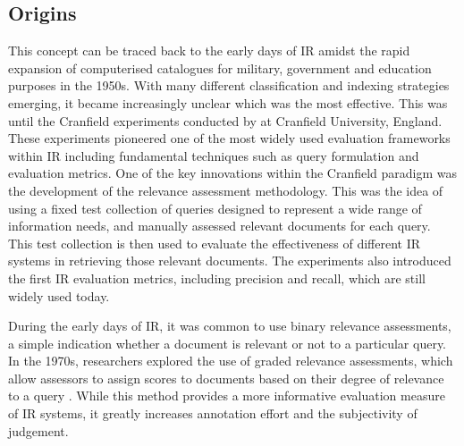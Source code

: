 \documentclass{l4proj}
\begin{document}
\subsection{Origins}
This concept can be traced back to the early days of IR amidst the rapid expansion of computerised catalogues for military, government and education purposes in the 1950s. With many different classification and indexing strategies emerging, it became increasingly unclear which was the most effective. This was until the Cranfield experiments conducted by \cite{cleverdon1967cranfield} at Cranfield University, England. These experiments pioneered one of the most widely used evaluation frameworks within IR including fundamental techniques such as query formulation and evaluation metrics. One of the key innovations within the Cranfield paradigm was the development of the relevance assessment methodology. This was the idea of using a fixed test collection of queries designed to represent a wide range of information needs, and manually assessed relevant documents for each query. This test collection is then used to evaluate the effectiveness of different IR systems in retrieving those relevant documents. The experiments also introduced the first IR evaluation metrics, including precision and recall, which are still widely used today. 

During the early days of IR, it was common to use binary relevance assessments, a simple indication whether a document is relevant or not to a particular query. In the 1970s, researchers explored the use of graded relevance assessments, which allow assessors to assign scores to documents based on their degree of relevance to a query \citep{salton1971smart, robertson1976relvance}. While this method provides a more informative evaluation measure of IR systems, it greatly increases annotation effort and the subjectivity of judgement.
\end{document}
